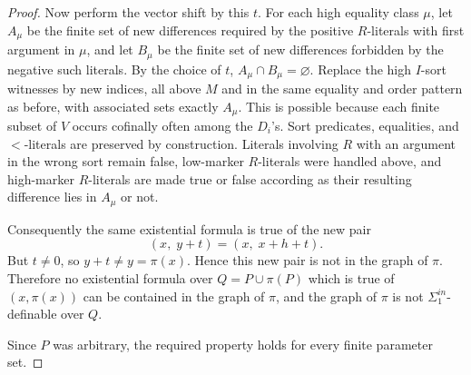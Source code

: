 \documentclass[12pt]{article}
\begin{document}
\begin{proof}
Now perform the vector shift by this $t$.  For each high equality class
$\mu$, let $A_\mu$ be the finite set of new differences required by the
positive $R$-literals with first argument in $\mu$, and let $B_\mu$ be
the finite set of new differences forbidden by the negative such
literals.  By the choice of $t$, $A_\mu\cap B_\mu=\varnothing$.  Replace
the high $I$-sort witnesses by new indices, all above $M$ and in the
same equality and order pattern as before, with associated sets exactly
$A_\mu$.  This is possible because each finite subset of $V$ occurs
cofinally often among the $D_i$'s.  Sort predicates, equalities, and
$<$-literals are preserved by construction.  Literals involving $R$ with
an argument in the wrong sort remain false, low-marker $R$-literals were
handled above, and high-marker $R$-literals are made true or false
according as their resulting difference lies in $A_\mu$ or not.

Consequently the same existential formula is true of the new pair
\[
        (x,\;y+t)=(x,\;x+h+t).
\]
But $t\neq0$, so $y+t\neq y=\pi(x)$.  Hence this new pair is not in the
graph of $\pi$.  Therefore no existential formula over
$Q=P\cup\pi(P)$ which is true of $(x,\pi(x))$ can be contained in the
graph of $\pi$, and the graph of $\pi$ is not
$\Sigma^{in}_1$-definable over $Q$.

Since $P$ was arbitrary, the required property holds for every finite
parameter set.
\end{proof}
\end{document}

